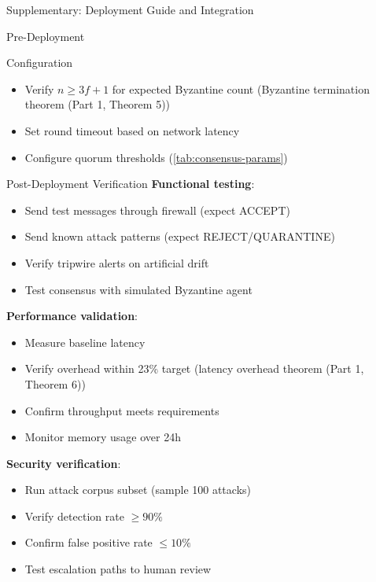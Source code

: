 \documentclass[
  ignorenonframetext,
]{beamer}
\begin{document}
\begin{frame}[fragile]{Supplementary: Deployment Guide and Integration}
\begin{block}{Pre-Deployment}
\begin{block}{Configuration}
\begin{itemize}
\item Verify $n \geq 3f + 1$ for expected Byzantine count (Byzantine termination theorem (Part 1, Theorem 5))
\item Set round timeout based on network latency
\item Configure quorum thresholds (\cref{tab:consensus-params})
\end{itemize}
\end{block}

\begin{block}{Post-Deployment Verification}
\protect{}\label{sec:post-deploy}
\textbf{Functional testing}:

\begin{itemize}
\item Send test messages through firewall (expect ACCEPT)
\item Send known attack patterns (expect REJECT/QUARANTINE)
\item Verify tripwire alerts on artificial drift
\item Test consensus with simulated Byzantine agent
\end{itemize}

\textbf{Performance validation}:

\begin{itemize}
\item Measure baseline latency
\item Verify overhead within 23\% target (latency overhead theorem (Part 1, Theorem 6))
\item Confirm throughput meets requirements
\item Monitor memory usage over 24h
\end{itemize}

\textbf{Security verification}:

\begin{itemize}
\item Run attack corpus subset (sample 100 attacks)
\item Verify detection rate $\geq 90\%$
\item Confirm false positive rate $\leq 10\%$
\item Test escalation paths to human review
\end{itemize}
\end{block}
\end{block}


\end{frame}
\end{document}

